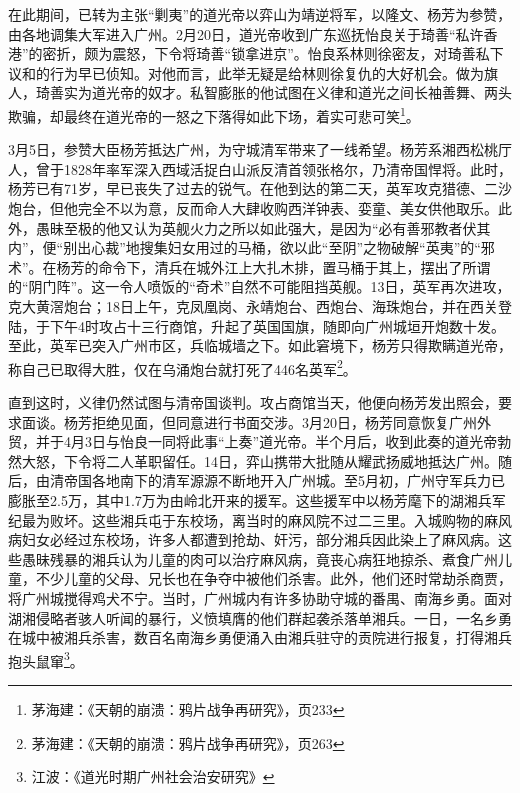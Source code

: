 在此期间，已转为主张“剿夷”的道光帝以弈山为靖逆将军，以隆文、杨芳为参赞，由各地调集大军进入广州。2月20日，道光帝收到广东巡抚怡良关于琦善“私许香港”的密折，颇为震怒，下令将琦善“锁拿进京”。怡良系林则徐密友，对琦善私下议和的行为早已侦知。对他而言，此举无疑是给林则徐复仇的大好机会。做为旗人，琦善实为道光帝的奴才。私智膨胀的他试图在义律和道光之间长袖善舞、两头欺骗，却最终在道光帝的一怒之下落得如此下场，着实可悲可笑\footnote{茅海建：《天朝的崩溃：鸦片战争再研究》，页233}。

3月5日，参赞大臣杨芳抵达广州，为守城清军带来了一线希望。杨芳系湘西松桃厅人，曾于1828年率军深入西域活捉白山派反清首领张格尔，乃清帝国悍将。此时，杨芳已有71岁，早已丧失了过去的锐气。在他到达的第二天，英军攻克猎德、二沙炮台，但他完全不以为意，反而命人大肆收购西洋钟表、娈童、美女供他取乐。此外，愚昧至极的他又认为英舰火力之所以如此强大，是因为“必有善邪教者伏其内”，便“别出心裁”地搜集妇女用过的马桶，欲以此“至阴”之物破解“英夷”的“邪术”。在杨芳的命令下，清兵在城外江上大扎木排，置马桶于其上，摆出了所谓的“阴门阵”。这一令人喷饭的“奇术”自然不可能阻挡英舰。13日，英军再次进攻，克大黄滘炮台；18日上午，克凤凰岗、永靖炮台、西炮台、海珠炮台，并在西关登陆，于下午4时攻占十三行商馆，升起了英国国旗，随即向广州城垣开炮数十发。至此，英军已突入广州市区，兵临城墙之下。如此窘境下，杨芳只得欺瞒道光帝，称自己已取得大胜，仅在乌涌炮台就打死了446名英军\footnote{茅海建：《天朝的崩溃：鸦片战争再研究》，页263}。

直到这时，义律仍然试图与清帝国谈判。攻占商馆当天，他便向杨芳发出照会，要求面谈。杨芳拒绝见面，但同意进行书面交涉。3月20日，杨芳同意恢复广州外贸，并于4月3日与怡良一同将此事“上奏”道光帝。半个月后，收到此奏的道光帝勃然大怒，下令将二人革职留任。14日，弈山携带大批随从耀武扬威地抵达广州。随后，由清帝国各地南下的清军源源不断地开入广州城。至5月初，广州守军兵力已膨胀至2.5万，其中1.7万为由岭北开来的援军。这些援军中以杨芳麾下的湖湘兵军纪最为败坏。这些湘兵屯于东校场，离当时的麻风院不过二三里。入城购物的麻风病妇女必经过东校场，许多人都遭到抢劫、奸污，部分湘兵因此染上了麻风病。这些愚昧残暴的湘兵认为儿童的肉可以治疗麻风病，竟丧心病狂地掠杀、煮食广州儿童，不少儿童的父母、兄长也在争夺中被他们杀害。此外，他们还时常劫杀商贾，将广州城搅得鸡犬不宁。当时，广州城内有许多协助守城的番禺、南海乡勇。面对湖湘侵略者骇人听闻的暴行，义愤填膺的他们群起袭杀落单湘兵。一日，一名乡勇在城中被湘兵杀害，数百名南海乡勇便涌入由湘兵驻守的贡院进行报复，打得湘兵抱头鼠窜\footnote{江波：《道光时期广州社会治安研究》}。

